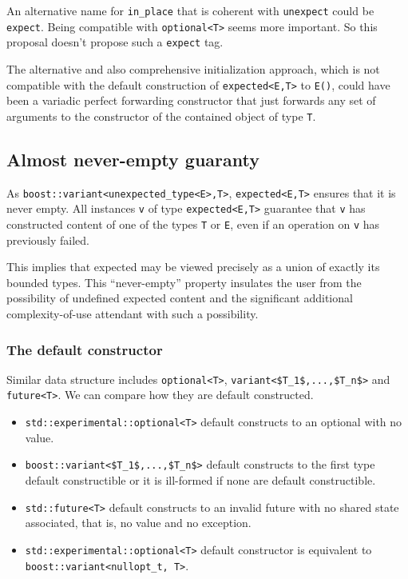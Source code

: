 \documentclass[a4paper,10pt]{article}
\newcommand{\cpp}[1]{\lstinline{#1}}
\begin{document}
\noindent
An alternative name for \cpp{in_place} that is coherent with \cpp{unexpect} could be \cpp{expect}. Being compatible with \cpp{optional<T>} seems more important. So this proposal doesn't propose such a \cpp{expect} tag.
\newline

The alternative and also comprehensive initialization approach, which is not compatible with the default construction of \cpp{expected<E,T>} to \cpp{E()}, could have been a variadic perfect forwarding constructor that just forwards any set of arguments to the constructor of the contained object of type \cpp{T}. 

\subsection{Almost never-empty guaranty}

As \cpp{boost::variant<unexpected_type<E>,T>}, \cpp{expected<E,T>} ensures that it is never empty. All instances \cpp{v} of type \cpp{expected<E,T>} guarantee that \cpp{v} has constructed content of one of the types \cpp{T} or \cpp{E}, even if an operation on \cpp{v} has previously failed.

This implies that expected may be viewed precisely as a union of exactly its bounded types. This ``never-empty'' property insulates the user from the possibility of undefined expected content and the significant additional complexity-of-use attendant with such a possibility.

\subsubsection{The default constructor}

Similar data structure includes \cpp{optional<T>}, \lstinline[mathescape]{variant<$T_1$,...,$T_n$>} and \cpp{future<T>}. We can compare how they are default constructed.
\begin{itemize}
\item \cpp{std::experimental::optional<T>} default constructs to an optional with no value. 
\item \lstinline[mathescape]{boost::variant<$T_1$,...,$T_n$>} default constructs to the first type default constructible or it is ill-formed if none are default constructible.
\item \cpp{std::future<T>} default constructs to an invalid future with no shared state associated, that is, no value and no exception.
\item \cpp{std::experimental::optional<T>} default constructor is equivalent to \cpp{boost::variant<nullopt_t, T>}.
\end{itemize}
\end{document}
